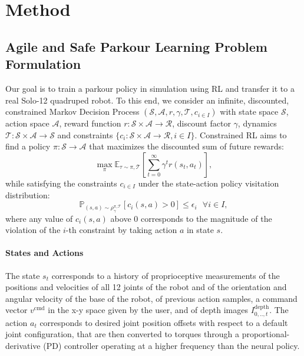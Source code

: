 \section{Method}


\subsection{Agile and Safe Parkour Learning Problem Formulation}

Our goal is to train a parkour policy in simulation using RL and transfer it to a real Solo-12 quadruped robot.
To this end, we consider an infinite, discounted, constrained Markov Decision Process $\left (\mathcal{S}, \mathcal{A}, r, \gamma, \mathcal{T}, c_{i \in I} \right )$ with state space $\mathcal{S}$, action space $\mathcal{A}$, reward function $r: \mathcal{S} \times \mathcal{A} \rightarrow \mathcal{R}$, discount factor $\gamma$, dynamics $\mathcal{T}: \mathcal{S} \times \mathcal{A} \rightarrow \mathcal{S}$ and constraints $\{ c_i: \mathcal{S} \times \mathcal{A} \rightarrow \mathcal{R}, i \in I\}$.
Constrained RL aims to find a policy $\pi: \mathcal{S} \rightarrow \mathcal{A}$ that maximizes the discounted sum of future rewards:
\begin{equation}
\max_\pi \mathbb{E}_{\tau \sim \pi, \mathcal{T}} \left [ \sum_{t=0}^\infty \gamma^t r(s_t, a_t) \right ],
\label{eq:mdp}
\end{equation}
while satisfying the constraints $c_{i \in I}$ under the state-action policy visitation distribution:
\begin{equation}
\mathbb{P}_{(s, a) \sim \rho^{\pi, \mathcal{T}}_\gamma} \left [ c_i(s, a) > 0 \right ] \leq \epsilon_i \text{ } \forall i \in I,
\label{eq:cstr_prob}
\end{equation}
where any value of $c_i(s, a)$ above $0$ corresponds to the magnitude of the violation of the $i$-th constraint by taking action $a$ in state $s$.

\paragraph{States and Actions} The state $s_t$ corresponds to a history of proprioceptive measurements of the positions and velocities of all 12 joints of the robot and of the orientation and angular velocity of the base of the robot, of previous action samples, a command vector $v^\text{cmd}$ in the x-y space given by the user, and of depth images $I^\text{depth}_{0, .., t}$.
The action $a_t$ corresponds to desired joint position offsets with respect to a default joint configuration, that are then converted to torques through a proportional-derivative (PD) controller operating at a higher frequency than the neural policy.

